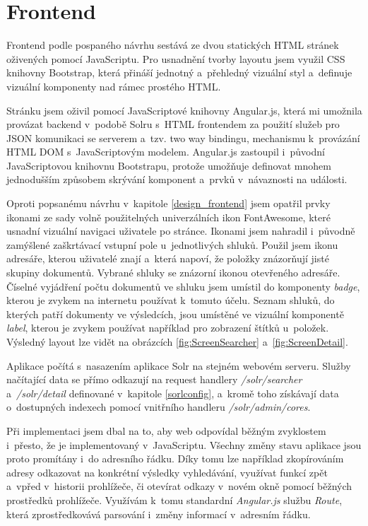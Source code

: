 \section{Frontend}
Frontend podle pospaného návrhu sestává ze dvou statických HTML stránek oživených pomocí JavaScriptu. Pro usnadnění tvorby layoutu jsem využil CSS knihovny Bootstrap\cite{bootstrap}, která přináší jednotný a~přehledný vizuální styl a~definuje vizuální komponenty nad rámec prostého HTML.

Stránku jsem oživil pomocí JavaScriptové knihovny Angular.js\cite{angular}, která mi umožnila provázat backend v~podobě Solru s~HTML frontendem za použití služeb pro JSON komunikaci se serverem a~tzv. two way bindingu, mechanismu k~provázání HTML DOM s~JavaScriptovým modelem. Angular.js zastoupil i~původní JavaScriptovou knihovnu Bootstrapu, protože umožňuje definovat mnohem jednodušším způsobem skrývání komponent a~prvků v~návaznosti na události.

Oproti popsanému návrhu v~kapitole \ref{design_frontend} jsem opatřil prvky ikonami ze sady volně použitelných univerzálních ikon FontAwesome\cite{fontawesome}, které usnadní vizuální navigaci uživatele po stránce. Ikonami jsem nahradil i~původně zamýšlené zaškrtávací vstupní pole u~jednotlivých shluků. Použil jsem ikonu adresáře, kterou uživatelé znají a~která napoví, že položky znázorňují jisté skupiny dokumentů. Vybrané shluky se znázorní ikonou otevřeného adresáře. Číselné vyjádření počtu dokumentů ve shluku jsem umístil do komponenty \emph{badge}, kterou je zvykem na internetu používat k~tomuto účelu. Seznam shluků, do kterých patří dokumenty ve výsledcích, jsou umístěné ve vizuální komponentě \emph{label}, kterou je zvykem používat například pro zobrazení štítků u~položek. Výsledný layout lze vidět na obrázcích \ref{fig:ScreenSearcher} a~\ref{fig:ScreenDetail}.

Aplikace počítá s~nasazením aplikace Solr na stejném webovém serveru. Služby načítající data se přímo odkazují na request handlery \emph{/solr/searcher} a~\emph{/solr/detail} definované v~kapitole \ref{sorlconfig}, a~kromě toho získávají data o~dostupných indexech pomocí vnitřního handleru \emph{/solr/admin/cores}.

Při implementaci jsem dbal na to, aby web odpovídal běžným zvyklostem i~přesto, že je implementovaný v~JavaScriptu. Všechny změny stavu aplikace jsou proto promítány i~do adresního řádku. Díky tomu lze například zkopírováním adresy odkazovat na konkrétní výsledky vyhledávání, využívat funkcí zpět a~vpřed v~historii prohlížeče, či otevírat odkazy v~novém okně pomocí běžných prostředků prohlížeče. Využívám k~tomu standardní \emph{Angular.js} službu \emph{Route}, která zprostředkovává parsování i~změny informací v~adresním řádku.

